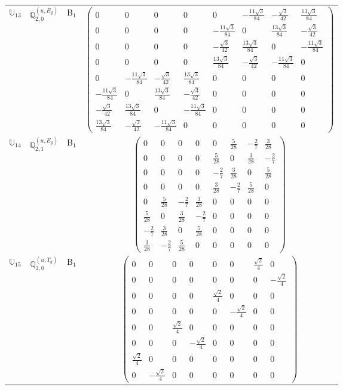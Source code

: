 \documentclass[fleqn,10pt,landscape]{article}
\begin{document}
\begin{itemize}
\begin{center}
\begin{longtable}{c|c|c|c}
$ \mathbb{U}_{13} $ & $\mathbb{Q}_{2,0}^{(u,E_{g})}$ & B$_{1}$ & $\begin{pmatrix} 0 & 0 & 0 & 0 & 0 & - \frac{11 \sqrt{3}}{84} & - \frac{\sqrt{3}}{42} & \frac{13 \sqrt{3}}{84} \\ 0 & 0 & 0 & 0 & - \frac{11 \sqrt{3}}{84} & 0 & \frac{13 \sqrt{3}}{84} & - \frac{\sqrt{3}}{42} \\ 0 & 0 & 0 & 0 & - \frac{\sqrt{3}}{42} & \frac{13 \sqrt{3}}{84} & 0 & - \frac{11 \sqrt{3}}{84} \\ 0 & 0 & 0 & 0 & \frac{13 \sqrt{3}}{84} & - \frac{\sqrt{3}}{42} & - \frac{11 \sqrt{3}}{84} & 0 \\ 0 & - \frac{11 \sqrt{3}}{84} & - \frac{\sqrt{3}}{42} & \frac{13 \sqrt{3}}{84} & 0 & 0 & 0 & 0 \\ - \frac{11 \sqrt{3}}{84} & 0 & \frac{13 \sqrt{3}}{84} & - \frac{\sqrt{3}}{42} & 0 & 0 & 0 & 0 \\ - \frac{\sqrt{3}}{42} & \frac{13 \sqrt{3}}{84} & 0 & - \frac{11 \sqrt{3}}{84} & 0 & 0 & 0 & 0 \\ \frac{13 \sqrt{3}}{84} & - \frac{\sqrt{3}}{42} & - \frac{11 \sqrt{3}}{84} & 0 & 0 & 0 & 0 & 0 \end{pmatrix}$ \\
$ \mathbb{U}_{14} $ & $\mathbb{Q}_{2,1}^{(u,E_{g})}$ & B$_{1}$ & $\begin{pmatrix} 0 & 0 & 0 & 0 & 0 & \frac{5}{28} & - \frac{2}{7} & \frac{3}{28} \\ 0 & 0 & 0 & 0 & \frac{5}{28} & 0 & \frac{3}{28} & - \frac{2}{7} \\ 0 & 0 & 0 & 0 & - \frac{2}{7} & \frac{3}{28} & 0 & \frac{5}{28} \\ 0 & 0 & 0 & 0 & \frac{3}{28} & - \frac{2}{7} & \frac{5}{28} & 0 \\ 0 & \frac{5}{28} & - \frac{2}{7} & \frac{3}{28} & 0 & 0 & 0 & 0 \\ \frac{5}{28} & 0 & \frac{3}{28} & - \frac{2}{7} & 0 & 0 & 0 & 0 \\ - \frac{2}{7} & \frac{3}{28} & 0 & \frac{5}{28} & 0 & 0 & 0 & 0 \\ \frac{3}{28} & - \frac{2}{7} & \frac{5}{28} & 0 & 0 & 0 & 0 & 0 \end{pmatrix}$ \\
$ \mathbb{U}_{15} $ & $\mathbb{Q}_{2,0}^{(u,T_{g})}$ & B$_{1}$ & $\begin{pmatrix} 0 & 0 & 0 & 0 & 0 & 0 & \frac{\sqrt{2}}{4} & 0 \\ 0 & 0 & 0 & 0 & 0 & 0 & 0 & - \frac{\sqrt{2}}{4} \\ 0 & 0 & 0 & 0 & \frac{\sqrt{2}}{4} & 0 & 0 & 0 \\ 0 & 0 & 0 & 0 & 0 & - \frac{\sqrt{2}}{4} & 0 & 0 \\ 0 & 0 & \frac{\sqrt{2}}{4} & 0 & 0 & 0 & 0 & 0 \\ 0 & 0 & 0 & - \frac{\sqrt{2}}{4} & 0 & 0 & 0 & 0 \\ \frac{\sqrt{2}}{4} & 0 & 0 & 0 & 0 & 0 & 0 & 0 \\ 0 & - \frac{\sqrt{2}}{4} & 0 & 0 & 0 & 0 & 0 & 0 \end{pmatrix}$ \\

\end{longtable}
\end{center}
\end{itemize}
\end{document}

